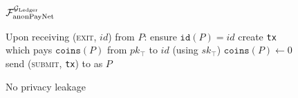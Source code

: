 \begin{figure}[H]
\begin{systembox}{$\mathcal{F}_{\mathrm{anonPayNet}}^{\mathcal{G}_{\mathrm{Ledger}}}$}
\begin{algorithmic}[1]
      \State Upon receiving (\textsc{exit}, $id$) from $P$:
      \Indent
        \State ensure $\mathtt{id}(P) = id$
        \State create \texttt{tx} which pays $\mathtt{coins}(P)$ from
        $pk_{\top}$ to $id$ (using $sk_{\top}$)
        \State $\mathtt{coins}(P) \gets 0$
        \State send (\textsc{submit}, \texttt{tx}) to \ledger as $P$
      \EndIndent
    \end{algorithmic}
  \end{systembox}
  \caption{No privacy leakage}
  \label{alg:anon-pay-func}
\end{figure}
